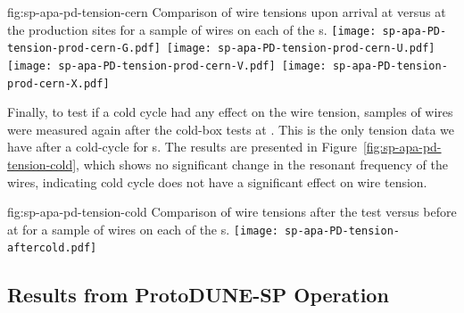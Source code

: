 



\begin{dunefigure}{fig:sp-apa-pd-tension-cern}
{Comparison of wire tensions upon arrival at  versus at the production sites for a sample of wires on each of the  s.}
\mbox{\texttt{[image: sp-apa-PD-tension-prod-cern-G.pdf]} %
\texttt{[image: sp-apa-PD-tension-prod-cern-U.pdf]}} \\
\vspace{3mm}
\mbox{\texttt{[image: sp-apa-PD-tension-prod-cern-V.pdf]} %
\texttt{[image: sp-apa-PD-tension-prod-cern-X.pdf]}}
\end{dunefigure}

Finally, to test if a cold cycle had any effect on the wire tension, samples of wires were measured again after the cold-box tests at . This is the only tension data we have after a cold-cycle for  s. The results are presented in Figure~\ref{fig:sp-apa-pd-tension-cold}, which shows no significant change in the resonant frequency of the wires, indicating cold cycle does not have a significant effect on wire tension.

\begin{dunefigure}{fig:sp-apa-pd-tension-cold}
{Comparison of wire tensions after the \coldbox test versus before at  for a sample of wires on each of the  s.}
\texttt{[image: sp-apa-PD-tension-aftercold.pdf]} 
\end{dunefigure}



\subsection{Results from ProtoDUNE-SP Operation}
\label{sec:fdsp-apa-qa-protodune-ops}


